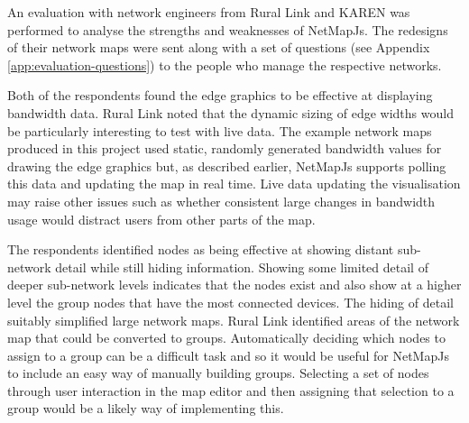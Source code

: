 \documentclass[11pt, a4paper]{article}
\begin{document}
An evaluation with network engineers from Rural Link and KAREN was performed to
analyse the strengths and weaknesses of NetMapJs. The redesigns of their network
maps were sent along with a set of questions (see Appendix
\ref{app:evaluation-questions}) to the people who manage the respective
networks.

%


Both of the respondents found the edge graphics to be effective at displaying
bandwidth data. Rural Link noted that the dynamic sizing of edge widths would be
particularly interesting to test with live data. The example network maps
produced in this project used static, randomly generated bandwidth values for
drawing the edge graphics but, as described earlier, NetMapJs supports polling
this data and updating the map in real time. Live data updating the
visualisation may raise other issues such as whether consistent large changes in
bandwidth usage would distract users from other parts of the map. 

The respondents identified nodes as being effective at showing distant sub-network
detail while still hiding information. Showing some limited detail of deeper
sub-network levels indicates that the nodes exist and also show at a higher
level the group nodes that have the most connected devices. The hiding of detail
suitably simplified large network maps. Rural Link identified areas of the
network map that could be converted to groups. Automatically deciding which
nodes to assign to a group can be a difficult task and so it would be useful for
NetMapJs to include an easy way of manually building groups. Selecting a set of
nodes through user interaction in the map editor and then assigning that
selection to a group would be a likely way of implementing this.
\end{document}
